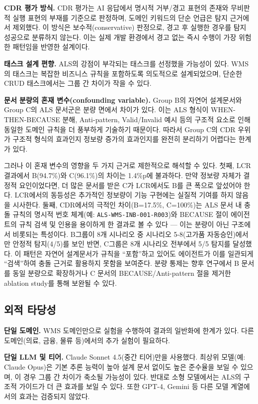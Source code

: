 \documentclass[conference]{IEEEtran}
\begin{document}
\textbf{CDR 평가 방식.} CDR 평가는 AI 응답에서 명시적 거부/경고 표현의 존재와 무비판적 실행 표현의 부재를 기준으로 판정하며, 도메인 키워드의 단순 언급은 탐지 근거에서 제외했다. 이 방식은 보수적(conservative) 판정으로, 경고 후 실행한 경우를 탐지 성공으로 분류하지 않는다. 이는 실제 개발 환경에서 경고 없는 즉시 수행이 가장 위험한 패턴임을 반영한 설계이다.

\textbf{태스크 설계 편향.} ALS의 강점이 부각되는 태스크를 선정했을 가능성이 있다. WMS의 태스크는 복잡한 비즈니스 규칙을 포함하도록 의도적으로 설계되었으며, 단순한 CRUD 태스크에서는 그룹 간 차이가 작을 수 있다.

\textbf{문서 분량의 혼재 변수(confounding variable).} Group B의 자연어 설계문서와 Group C의 ALS 문서군은 분량 면에서 차이가 있다. 이는 ALS 형식이 WHEN-THEN-BECAUSE 분해, Anti-pattern, Valid/Invalid 예시 등의 구조적 요소로 인해 동일한 도메인 규칙을 더 풍부하게 기술하기 때문이다. 따라서 Group C의 CDR 우위가 구조적 형식의 효과인지 정보량 증가의 효과인지를 완전히 분리하기 어렵다는 한계가 있다.

그러나 이 혼재 변수의 영향을 두 가지 근거로 제한적으로 해석할 수 있다. 첫째, LCR 결과에서 B(94.7\%)와 C(96.1\%)의 차이는 1.4\%p에 불과하다. 만약 정보량 자체가 결정적 요인이었다면, 더 많은 문서를 받은 C가 LCR에서도 B를 큰 폭으로 앞섰어야 한다. LCR에서의 동등성은 추가적인 정보량이 기능 구현에는 실질적 기여를 하지 않음을 시사한다. 둘째, CDR에서의 극적인 차이(B=17.5\%, C=100\%)는 ALS 문서 내 충돌 규칙의 명시적 번호 체계(예: \texttt{ALS-WMS-INB-001-R003})와 BECAUSE 절이 에이전트의 규칙 검색 및 인용을 용이하게 한 결과로 볼 수 있다 --- 이는 분량이 아닌 구조에서 비롯되는 특성이다. B그룹이 8개 시나리오 중 시나리오 5-8(고가품 자동승인)에서만 안정적 탐지(4/5)를 보인 반면, C그룹은 8개 시나리오 전부에서 5/5 탐지를 달성했다. 이 패턴은 자연어 설계문서가 규칙을 ``포함''하고 있어도 에이전트가 이를 일관되게 ``검색''하여 충돌 근거로 활용하지 못함을 보여준다. 분량 통제는 향후 연구에서 B 문서를 동일 분량으로 확장하거나 C 문서의 BECAUSE/Anti-pattern 절을 제거한 ablation study를 통해 보완될 수 있다.


\subsection{외적 타당성}

\textbf{단일 도메인.} WMS 도메인만으로 실험을 수행하여 결과의 일반화에 한계가 있다. 다른 도메인(의료, 금융, 물류 등)에서의 추가 실험이 필요하다.

\textbf{단일 LLM 및 티어.} Claude Sonnet 4.5(중간 티어)만을 사용했다. 최상위 모델(예: Claude Opus)은 기본 추론 능력이 높아 설계 문서 없이도 높은 준수율을 보일 수 있으며, 이 경우 그룹 간 차이가 축소될 가능성이 있다. 반대로 소형 모델에서는 ALS의 구조적 가이드가 더 큰 효과를 보일 수 있다. 또한 GPT-4, Gemini 등 다른 모델 계열에서의 효과는 검증되지 않았다.
\end{document}
